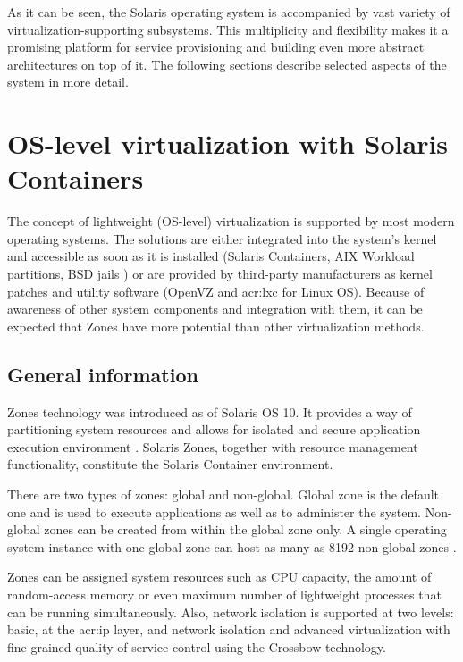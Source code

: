 \documentclass[11pt]{book}
\begin{document}
      As it can be seen, the Solaris operating system is accompanied by vast variety of virtualization-supporting
      subsystems. This multiplicity and flexibility makes it a promising platform for service provisioning and building
      even more abstract architectures on top of it. The following sections describe selected aspects of the system in
      more detail.


    \section{OS-level virtualization with Solaris Containers}
    \label{sec:sol:containers}


      The concept of lightweight (OS-level) virtualization is supported by most modern operating systems. The solutions
      are either integrated into the system's kernel and accessible as soon as it is installed (Solaris Containers, AIX
      Workload partitions, BSD jails \cite{kamp}) or are provided by third-party manufacturers as kernel patches and
      utility software (OpenVZ and \gls{acr:lxc} for Linux OS). Because of awareness of other system components and
      integration with them, it can be expected that Zones have more potential than other virtualization methods.


      \subsection{General information}
      \label{sub:}

        Zones technology was introduced as of Solaris OS 10. It provides a way of partitioning system resources and
        allows for isolated and secure application execution environment \cite{sag}. Solaris Zones, together with
        resource management functionality, constitute the Solaris Container environment.

        There are two types of zones: global and non-global. Global zone is the default one and is used to execute
        applications as well as to administer the system. Non-global zones can be created from within the global zone
        only. A single operating system instance with one global zone can host as many as 8192 non-global zones
        \cite{sag}.

        Zones can be assigned system resources such as CPU capacity, the amount of random-access memory or even maximum
        number of lightweight processes that can be running simultaneously. Also, network isolation is supported at two
        levels: basic, at the \gls{acr:ip} layer, and network isolation and advanced virtualization with fine grained
        quality of service control using the Crossbow technology.
\end{document}
